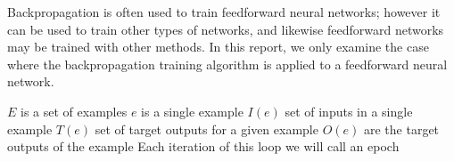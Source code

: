 \documentclass[11pt]{article}
\begin{document}
Backpropagation is often used to train feedforward neural networks; however it can be used to train other types of networks, and
likewise feedforward networks may be trained with other methods. In this report, we only examine the case where the backpropagation
training algorithm is applied to a feedforward neural network.

$E$ is a set of examples
$e$ is a single example
$I(e)$ set of inputs in a single example
$T(e)$ set of target outputs for a given example
$O(e)$ are the target outputs of the example
Each iteration of this loop we will call an epoch


% 
\end{document}
